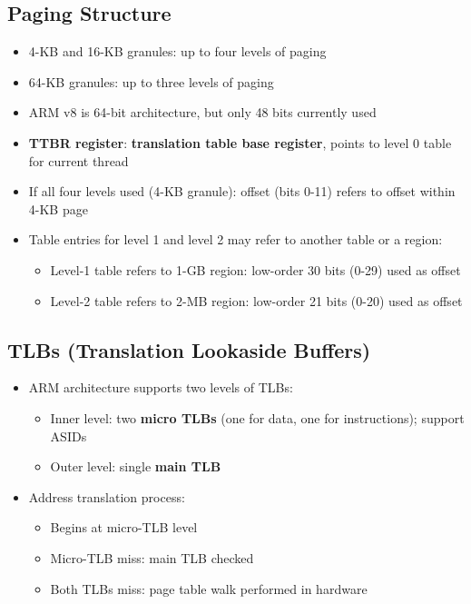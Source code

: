 \subsection*{Paging Structure}
\begin{itemize}
    \item 4-KB and 16-KB granules: up to four levels of paging
    \item 64-KB granules: up to three levels of paging
    \item ARM v8 is 64-bit architecture, but only 48 bits currently used
    \item \textbf{TTBR register}: \textbf{translation table base register}, points to level 0 table for current thread
    \item If all four levels used (4-KB granule): offset (bits 0-11) refers to offset within 4-KB page
    \item Table entries for level 1 and level 2 may refer to another table or a region:
    \begin{itemize}
        \item Level-1 table refers to 1-GB region: low-order 30 bits (0-29) used as offset
        \item Level-2 table refers to 2-MB region: low-order 21 bits (0-20) used as offset
    \end{itemize}
\end{itemize}

\subsection*{TLBs (Translation Lookaside Buffers)}
\begin{itemize}
    \item ARM architecture supports two levels of TLBs:
    \begin{itemize}
        \item Inner level: two \textbf{micro TLBs} (one for data, one for instructions); support ASIDs
        \item Outer level: single \textbf{main TLB}
    \end{itemize}
    \item Address translation process:
    \begin{itemize}
        \item Begins at micro-TLB level
        \item Micro-TLB miss: main TLB checked
        \item Both TLBs miss: page table walk performed in hardware
    \end{itemize}
\end{itemize}

